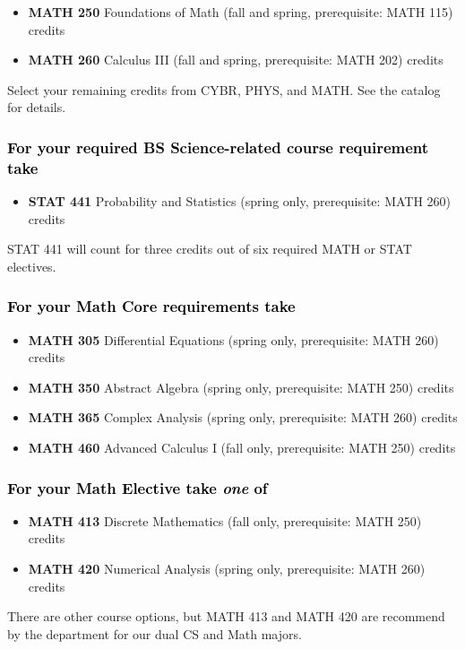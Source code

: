 \documentclass[10pt]{article}
\newenvironment{mypar}[2]
   {\begin{list}{}%
     {\setlength\leftmargin{#1}
     \setlength\rightmargin{#2}}
     \item[]}
   {\end{list}}
\newcommand{\foundations}{\textbf{MATH 250} Foundations of Math (fall and spring, prerequisite: MATH 115)  \dotfill 3 credits}
\newcommand{\calcthree}{\textbf{MATH 260} Calculus III  (fall and spring, prerequisite: MATH 202) \dotfill 5 credits}
\newcommand{\discrete}{\textbf{MATH 413} Discrete Mathematics  (fall only, prerequisite: MATH 250)\dotfill 3 credits}
\newcommand{\statistics}{\textbf{STAT 441} Probability and Statistics (spring only, prerequisite: MATH 260)  \dotfill  3 credits}
\newcommand{\diffeq}{\textbf{MATH 305}	Differential Equations (spring only, prerequisite: MATH 260) \dotfill 	3 credits}
\newcommand{\abstractalgebra}{\textbf{MATH 350}	Abstract Algebra (spring only, prerequisite: MATH 250) \dotfill 	3 credits}
\newcommand{\complex}{\textbf{MATH 365}	Complex Analysis (spring only,  prerequisite: MATH 260) \dotfill 3 credits}
\newcommand{\advancedcalc}{\textbf{MATH 460}	Advanced Calculus I  (fall only,   prerequisite: MATH 250) \dotfill 3 credits}
\newcommand{\numerical}{\textbf{MATH 420}   Numerical Analysis   (spring only, prerequisite: MATH 260)\dotfill 3 credits}
\begin{document}
\begin{itemize}
\item \foundations
\item  \calcthree
\end{itemize}
\begin{mypar}{0.5cm}{0.5cm} Select your remaining credits from CYBR, PHYS,  and MATH. See the catalog for details.
\end{mypar}

\subsubsection*{\textcolor{black}{For your required BS Science-related course requirement take}}
\begin{itemize}
\item \statistics
\end{itemize}
\begin{mypar}{0.5cm}{0.5cm} STAT 441 will count for three credits out of six required MATH or STAT electives.
\end{mypar}

\subsubsection*{\textcolor{black}{For your Math Core requirements take}}

\begin{itemize}
  \item \diffeq
  \item \abstractalgebra
  \item \complex
  \item \advancedcalc
\end{itemize}



\subsubsection*{\textcolor{black}{For your  Math Elective take \emph{one} of}}
\begin{itemize}
\item \discrete
\item \numerical
\end{itemize}
\begin{mypar}{0.5cm}{0.5cm}  There are other course options, but  MATH 413 and MATH 420 are recommend by the department for our
dual CS and Math majors. \end{mypar}

\begin{center} \fbox{
  {\textcolor{unkblue}{Continues on next page.}}}
\end{center}
\end{document}
